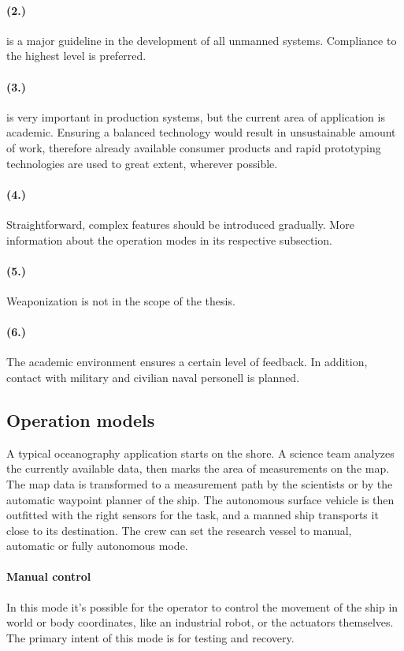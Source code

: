 \paragraph{(2.)} is a major guideline in the development of all unmanned systems. Compliance to the highest level is preferred.

\paragraph{(3.)} is very important in production systems, but the current area of application is academic. Ensuring a balanced technology would result in unsustainable amount of work, therefore already available consumer products and rapid prototyping technologies are used to great extent, wherever possible.

\paragraph{(4.)} Straightforward, complex features should be introduced gradually. More information about the operation modes in its respective subsection.

\paragraph{(5.)} Weaponization is not in the scope of the thesis.

\paragraph{(6.)} The academic environment ensures a certain level of feedback. In addition, contact with military and civilian naval personell is planned.

\subsection*{Operation models}

A typical oceanography application starts on the shore. A science team analyzes the currently available data, then marks the area of measurements on the map. The  map data is transformed to a measurement path by the scientists or by the automatic waypoint planner of the ship. The autonomous surface vehicle is then outfitted with the right sensors for the task, and a manned ship transports it close to its destination. The crew can set the research vessel to manual, automatic or fully autonomous mode.

\paragraph{Manual control}
In this mode it's possible for the operator to control the movement of the ship in world or body coordinates, like an industrial robot, or the actuators themselves. The primary intent of this mode is for testing and recovery.

